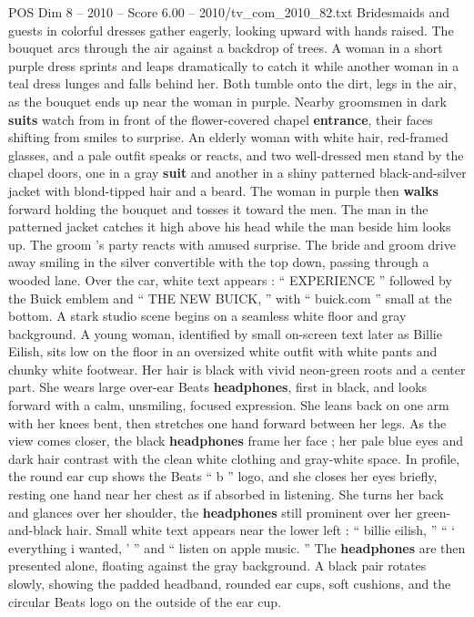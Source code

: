 \begin{textsample}{POS Dim 8 – 2010 – Score 6.00 – 2010/tv\_com\_2010\_82.txt}
Bridesmaids and guests in colorful dresses gather eagerly, looking upward with hands raised.
The bouquet arcs through the air against a backdrop of trees.
A woman in a short purple dress sprints and leaps dramatically to catch it while another woman in a teal dress lunges and falls behind her.
Both tumble onto the dirt, legs in the air, as the bouquet ends up near the woman in purple.
Nearby groomsmen in dark \textbf{suits} watch from in front of the flower-covered chapel \textbf{entrance}, their faces shifting from smiles to surprise.
An elderly woman with white hair, red-framed glasses, and a pale outfit speaks or reacts, and two well-dressed men stand by the chapel doors, one in a gray \textbf{suit} and another in a shiny patterned black-and-silver jacket with blond-tipped hair and a beard.
The woman in purple then \textbf{walks} forward holding the bouquet and tosses it toward the men.
The man in the patterned jacket catches it high above his head while the man beside him looks up.
The groom ’s party reacts with amused surprise.
The bride and groom drive away smiling in the silver convertible with the top down, passing through a wooded lane.
Over the car, white text appears : “ EXPERIENCE ” followed by the Buick emblem and “ THE NEW BUICK, ” with “ buick.com ” small at the bottom.
A stark studio scene begins on a seamless white floor and gray background.
A young woman, identified by small on-screen text later as Billie Eilish, sits low on the floor in an oversized white outfit with white pants and chunky white footwear.
Her hair is black with vivid neon-green roots and a center part.
She wears large over-ear Beats \textbf{headphones}, first in black, and looks forward with a calm, unsmiling, focused expression.
She leans back on one arm with her knees bent, then stretches one hand forward between her legs.
As the view comes closer, the black \textbf{headphones} frame her face ; her pale blue eyes and dark hair contrast with the clean white clothing and gray-white space.
In profile, the round ear cup shows the Beats “ b ” logo, and she closes her eyes briefly, resting one hand near her chest as if absorbed in listening.
She turns her back and glances over her shoulder, the \textbf{headphones} still prominent over her green-and-black hair.
Small white text appears near the lower left : “ billie eilish, ” “ ‘ everything i wanted, ’ ” and “ listen on apple music. ” The \textbf{headphones} are then presented alone, floating against the gray background.
A black pair rotates slowly, showing the padded headband, rounded ear cups, soft cushions, and the circular Beats logo on the outside of the ear cup.

\end{textsample}
